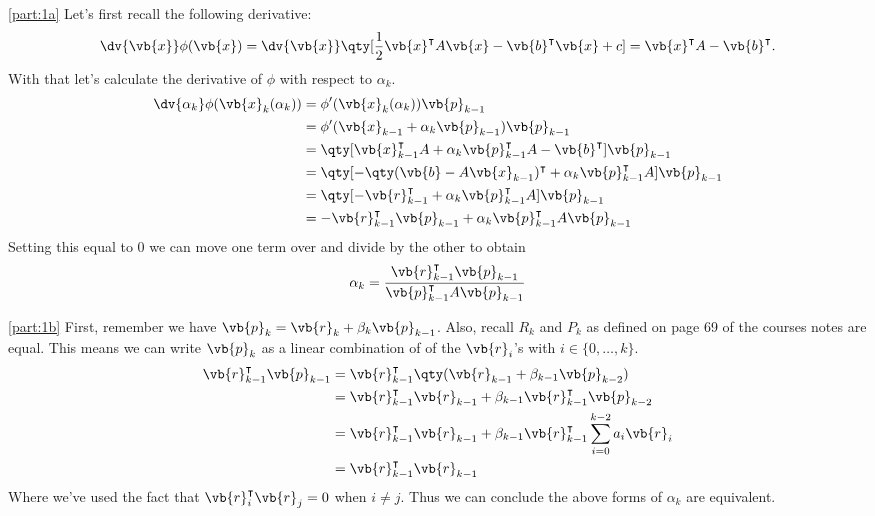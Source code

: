\documentclass[boxes,pages]{homework}
\newcommand{\tpose}[1]{#1^\intercal}
\begin{document}
\begin{solution}
	\ref{part:1a}
	Let's first recall the following derivative:
	\begin{equation*}
		\dv{\vb{x}}\phi(\vb{x}) = \dv{\vb{x}}\qty[\frac{1}{2}\tpose{\vb{x}}A\vb{x} - \tpose{\vb{b}}\vb{x} + c] = \tpose{\vb{x}}A - \tpose{\vb{b}}.
	\end{equation*}
	With that let's calculate the derivative of $\phi$ with respect to $\alpha_k$.
	\begin{align*}
		\dv{\alpha_k}\phi(\vb{x}_k(\alpha_k)) & = \phi'(\vb{x}_k(\alpha_k))\vb{p}_{k-1}                                                     \\
		                                      & = \phi'(\vb{x}_{k-1} + \alpha_k\vb{p}_{k-1})\vb{p}_{k-1}                                    \\
		                                      & = \qty[\tpose{\vb{x}_{k-1}}A + \alpha_k \tpose{\vb{p}_{k-1}}A - \tpose{\vb{b}}]\vb{p}_{k-1} \\
		                                      & = \qty[-\tpose{\qty(\vb{b} - A\vb{x}_{k-1})} + \alpha_k \tpose{\vb{p}_{k-1}}A]\vb{p}_{k-1}  \\
		                                      & = \qty[-\tpose{\vb{r}_{k-1}} + \alpha_k \tpose{\vb{p}_{k-1}}A]\vb{p}_{k-1}                  \\
		                                      & = -\tpose{\vb{r}_{k-1}}\vb{p}_{k-1} + \alpha_k \tpose{\vb{p}_{k-1}}A\vb{p}_{k-1}
	\end{align*}
	Setting this equal to 0 we can move one term over and divide by the other to obtain
	\begin{equation*}
		\alpha_k = \frac{\tpose{\vb{r}_{k-1}}\vb{p}_{k-1}}{\tpose{\vb{p}_{k-1}}A\vb{p}_{k-1}}
	\end{equation*}

	\ref{part:1b}
	First, remember we have $\vb{p}_k = \vb{r}_k + \beta_k\vb{p}_{k-1}$.
	Also, recall $R_k$ and $P_k$ as defined on page 69 of the courses notes are equal. This means we can write $\vb{p}_k$ as a linear combination of of the $\vb{r}_i$'s with $i\in\{0, \ldots, k\}$.
	\begin{align*}
		\tpose{\vb{r}_{k-1}}\vb{p}_{k-1} & = \tpose{\vb{r}_{k-1}}\qty(\vb{r}_{k-1} + \beta_{k-1}\vb{p}_{k-2})                                \\
		                                 & = \tpose{\vb{r}_{k-1}}\vb{r}_{k-1} + \beta_{k-1}\tpose{\vb{r}_{k-1}}\vb{p}_{k-2}                  \\
		                                 & = \tpose{\vb{r}_{k-1}}\vb{r}_{k-1} + \beta_{k-1}\tpose{\vb{r}_{k-1}}\sum_{i = 0}^{k-2}a_i\vb{r}_i \\
		                                 & = \tpose{\vb{r}_{k-1}}\vb{r}_{k-1}
	\end{align*}
	Where we've used the fact that $\tpose{\vb{r}_{i}}\vb{r}_{j} = 0$ when $i\neq j$.
	Thus we can conclude the above forms of $\alpha_k$ are equivalent.
\end{solution}
\end{document}
